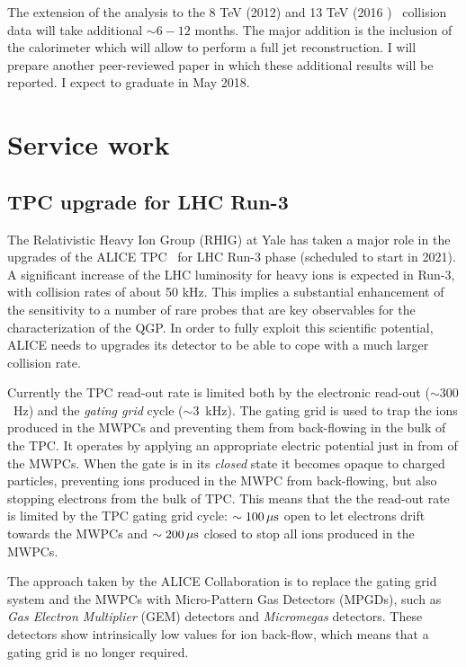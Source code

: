 \documentclass[12pt, a4paper, twoside, titlepage]{article}
\begin{document}
The extension of the analysis to the 8 TeV (2012) and 13 TeV (2016 ) \pp\ collision data will take additional $\sim 6-12$ months. The major addition is the inclusion of the calorimeter
which will allow to perform a full jet reconstruction.
I will prepare another peer-reviewed paper in which these additional results will be reported.
I expect to graduate in May 2018.

\section{Service work}
\label{sect:ServiceWork}

\subsection{TPC upgrade for LHC Run-3}
The Relativistic Heavy Ion Group (RHIG) at Yale has taken a major role in the upgrades of the ALICE TPC~\cite{} for LHC Run-3 phase (scheduled to start in 2021).
A significant increase of the LHC luminosity for heavy ions is expected in Run-3, with collision rates of about 50 kHz. This implies a substantial enhancement
of the sensitivity to a number of rare probes that are key observables for the characterization of the QGP. In order to fully exploit this scientific potential, ALICE needs to
upgrades its detector to be able to cope with a much larger collision rate.

Currently the TPC read-out rate is limited both by the electronic read-out ($\sim 300$~Hz) and the \emph{gating grid} cycle ($\sim 3$~kHz).
The gating grid is used to trap the ions produced in the MWPCs and preventing them from back-flowing in the bulk of the TPC.
It operates by applying an appropriate electric potential just in from of the MWPCs. When the gate is in its \emph{closed} state
it becomes opaque to charged particles, preventing ions produced in the MWPC from back-flowing, but also stopping
electrons from the bulk of TPC. This means that the the read-out rate is limited by the TPC gating grid cycle: $\sim 100\, \rm \mu s$
open to let electrons drift towards the MWPCs and $\sim 200\, \rm \mu s$ closed to stop all ions produced in the MWPCs.

The approach taken by the ALICE Collaboration is to replace the gating grid system and the MWPCs with Micro-Pattern Gas Detectors (MPGDs),
such as \emph{Gas Electron Multiplier} (GEM) detectors and \emph{Micromegas} detectors. These detectors show intrinsically low values for ion back-flow,
which means that a gating grid is no longer required.
\end{document}

